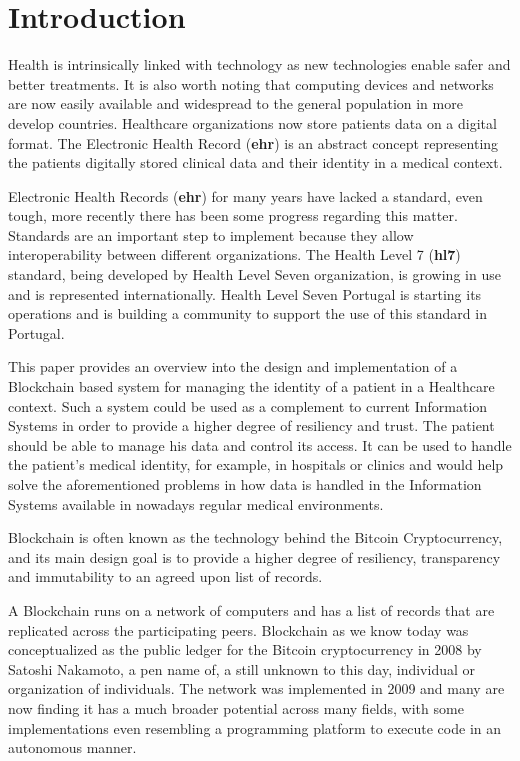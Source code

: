 \chapter{Introduction}

Health is intrinsically linked with technology as new technologies enable safer
and better treatments. It is also worth noting that computing devices and
networks are now easily available and widespread to the general population in
more develop countries. Healthcare organizations now store patients data on a
digital format. The Electronic Health Record (\textbf{ehr}) is an abstract
concept representing the patients digitally stored clinical data and their
identity in a medical context.

Electronic Health Records (\textbf{ehr}) for many years have lacked a standard,
even tough, more recently there has been some progress regarding this matter.
Standards are an important step to implement because they allow
interoperability between different organizations. The Health Level 7
(\textbf{hl7}) standard, being developed by Health Level Seven organization, is
growing in use and is represented internationally. Health Level Seven Portugal
is starting its operations and is building a community to support the use of
this standard in Portugal. \cite{HealthLevel7}

This paper provides an overview into the design and implementation of a
Blockchain based system for managing the identity of a patient in a Healthcare
context. Such a system could be used as a complement to current Information
Systems in order to provide a higher degree of resiliency and trust. The
patient should be able to manage his data and control its access. It can be
used to handle the patient’s medical identity, for example, in hospitals or
clinics and would help solve the aforementioned problems in how data is handled
in the Information Systems available in nowadays regular medical environments.

Blockchain is often known as the technology behind the Bitcoin Cryptocurrency,
and its main design goal is to provide a higher degree of resiliency,
transparency and immutability to an agreed upon list of records.

A Blockchain runs on a network of computers and has a list of records that are
replicated across the participating peers. Blockchain as we know today was
conceptualized as the public ledger for the Bitcoin cryptocurrency in 2008 by
Satoshi Nakamoto, a pen name of, a still unknown to this day, individual or
organization of individuals. The network was implemented in 2009 and many are
now finding it has a much broader potential across many fields, with some
implementations even resembling a programming platform to execute code in an
autonomous manner.  \cite{Nakamoto2008}

